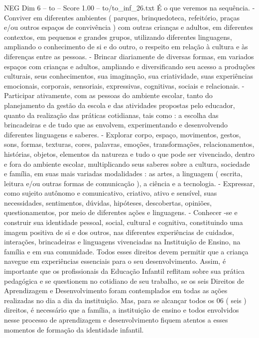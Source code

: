 \begin{textsample}{NEG Dim 6 – to – Score 1.00 – to/to\_inf\_26.txt}
É o que veremos na sequência. - Conviver em diferentes ambientes ( parques, brinquedoteca, refeitório, praças e/ou outros espaços de convivência ) com outras crianças e adultos, em diferentes contextos, em pequenos e grandes grupos, utilizando diferentes linguagens, ampliando o conhecimento de si e do outro, o respeito em relação à cultura e às diferenças entre as pessoas. - Brincar diariamente de diversas formas, em variados espaços com crianças e adultos, ampliando e diversificando seu acesso a produções culturais, seus conhecimentos, sua imaginação, sua criatividade, suas experiências emocionais, corporais, sensoriais, expressivas, cognitivas, sociais e relacionais. - Participar ativamente, com as pessoas do ambiente escolar, tanto do planejamento da gestão da escola e das atividades propostas pelo educador, quanto da realização das práticas cotidianas, tais como : a escolha das brincadeiras e de tudo que as envolvem, experimentando e desenvolvendo diferentes linguagens e saberes. - Explorar corpo, espaço, movimentos, gestos, sons, formas, texturas, cores, palavras, emoções, transformações, relacionamentos, histórias, objetos, elementos da natureza e tudo o que pode ser vivenciado, dentro e fora do ambiente escolar, multiplicando seus saberes sobre a cultura, sociedade e família, em suas mais variadas modalidades : as artes, a linguagem ( escrita, leitura e/ou outras formas de comunicação ), a ciência e a tecnologia. - Expressar, como sujeito autônomo e comunicativo, criativo, ativo e sensível, suas necessidades, sentimentos, dúvidas, hipóteses, descobertas, opiniões, questionamentos, por meio de diferentes ações e linguagens. - Conhecer -se e construir sua identidade pessoal, social, cultural e cognitiva, constituindo uma imagem positiva de si e dos outros, nas diferentes experiências de cuidados, interações, brincadeiras e linguagens vivenciadas na Instituição de Ensino, na família e em sua comunidade.
Todos esses direitos devem permitir que a criança navegue em experiências essenciais para o seu desenvolvimento.
Assim, é importante que os profissionais da Educação Infantil reflitam sobre sua prática pedagógica e se questionem no cotidiano de seu trabalho, se os seis Direitos de Aprendizagem e Desenvolvimento foram contemplados em todas as ações realizadas no dia a dia da instituição.
Mas, para se alcançar todos os 06 ( seis ) direitos, é necessário que a família, a instituição de ensino e todos envolvidos nesse processo de aprendizagem e desenvolvimento fiquem atentos a esses momentos de formação da identidade infantil.

\end{textsample}
